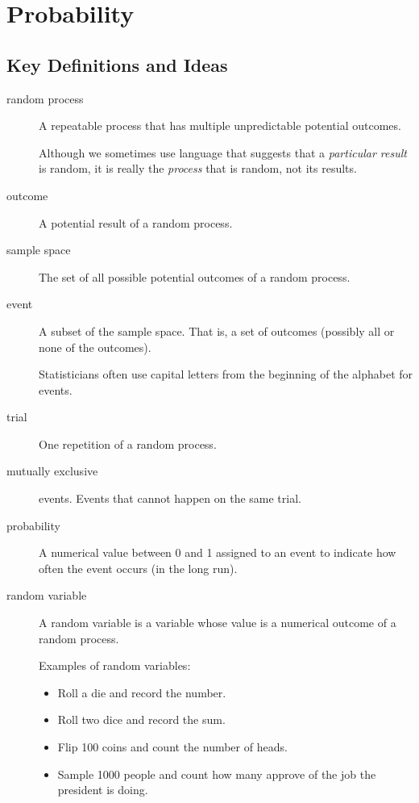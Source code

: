 \documentclass[twoside]{book}\usepackage[]{graphicx}\usepackage[]{xcolor}
\def\Chapter#1{%
\chapter{#1}
}
\newif\ifsolutions
\newif\ifsolutionslocal
\begin{document}
\shipoutProblems

\ifsolutions
\ifsolutionslocal
\newpage
\section*{Solutions}
\shipoutSolutions
\fi
\fi




\Chapter{Probability}

\section{Key Definitions and Ideas}

\begin{description}
\item[random process]
A repeatable process that has multiple unpredictable potential outcomes.

Although we sometimes use language that suggests that a \emph{particular result} is 
random, it is really the \emph{process} that is random, not its results.

\item[outcome]
A potential result of a random process.

\item[sample space]
The set of all possible potential outcomes of a random process.

\item[event]
A subset of the sample space.  
That is, a set of outcomes (possibly all or none of the outcomes).

Statisticians often use capital letters from the beginning of the alphabet
for events.

\item[trial] One repetition of a random process.

\item[mutually exclusive] events.
Events that cannot happen on the same trial.

\item[probability] A numerical value between 0 and 1 assigned to 
an event to indicate how often the event occurs (in the long run).

\item[random variable]
A random variable is a variable whose value is a numerical outcome of a random process.

Examples of random variables: 
\begin{itemize}
\item
Roll a die and record the number.
\item
Roll two dice and record the sum.
\item
Flip 100 coins and count the number of heads.
\item
Sample 1000 people and count how many approve of the job the president is doing.
\end{itemize}


\end{description}
\end{document}
